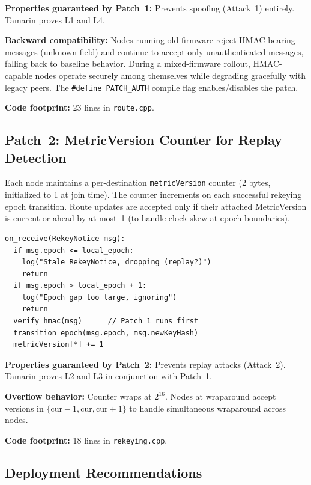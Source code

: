 \documentclass[journal]{IEEEtran}
\begin{document}
\textbf{Properties guaranteed by Patch~1:}
Prevents spoofing (Attack~1) entirely. Tamarin proves L1 and L4.

\textbf{Backward compatibility:} Nodes running old firmware reject
HMAC-bearing messages (unknown field) and continue to accept only
unauthenticated messages, falling back to baseline behavior. During
a mixed-firmware rollout, HMAC-capable nodes operate securely among
themselves while degrading gracefully with legacy peers. The
\texttt{\#define PATCH\_AUTH} compile flag enables/disables the patch.

\textbf{Code footprint:} 23 lines in \texttt{route.cpp}.

\subsection{Patch~2: MetricVersion Counter for Replay Detection}

Each node maintains a per-destination \texttt{metricVersion} counter
(2 bytes, initialized to 1 at join time). The counter increments
on each successful rekeying epoch transition. Route updates are
accepted only if their attached MetricVersion is current or ahead
by at most~1 (to handle clock skew at epoch boundaries).

\begin{lstlisting}[caption={MetricVersion check pseudocode (rekeying.cpp)}]
on_receive(RekeyNotice msg):
  if msg.epoch <= local_epoch:
    log("Stale RekeyNotice, dropping (replay?)")
    return
  if msg.epoch > local_epoch + 1:
    log("Epoch gap too large, ignoring")
    return
  verify_hmac(msg)      // Patch 1 runs first
  transition_epoch(msg.epoch, msg.newKeyHash)
  metricVersion[*] += 1
\end{lstlisting}

\textbf{Properties guaranteed by Patch~2:}
Prevents replay attacks (Attack~2). Tamarin proves L2 and L3 in
conjunction with Patch~1.

\textbf{Overflow behavior:} Counter wraps at $2^{16}$. Nodes at
wraparound accept versions in $\{\text{cur}-1, \text{cur},
\text{cur}+1\}$ to handle simultaneous wraparound across nodes.

\textbf{Code footprint:} 18 lines in \texttt{rekeying.cpp}.

\subsection{Deployment Recommendations}
\end{document}
